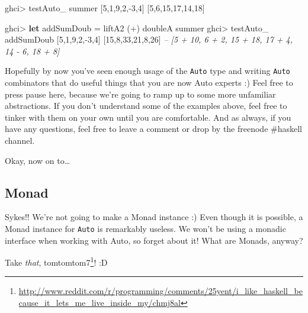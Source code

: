 \documentclass[]{article}
\newenvironment{Shaded}{}{}
\newcommand{\KeywordTok}[1]{\textcolor[rgb]{0.00,0.44,0.13}{\textbf{{#1}}}}
\newcommand{\DecValTok}[1]{\textcolor[rgb]{0.25,0.63,0.44}{{#1}}}
\newcommand{\CommentTok}[1]{\textcolor[rgb]{0.38,0.63,0.69}{\textit{{#1}}}}
\newcommand{\FunctionTok}[1]{\textcolor[rgb]{0.02,0.16,0.49}{{#1}}}
\newcommand{\NormalTok}[1]{{#1}}
\renewcommand{\href}[2]{#2\footnote{\url{#1}}}
\begin{document}
\begin{Shaded}
\begin{Highlighting}[]
\NormalTok{ghci}\FunctionTok{>} \NormalTok{testAuto_ summer [}\DecValTok{5}\NormalTok{,}\DecValTok{1}\NormalTok{,}\DecValTok{9}\NormalTok{,}\DecValTok{2}\NormalTok{,}\FunctionTok{-}\DecValTok{3}\NormalTok{,}\DecValTok{4}\NormalTok{]}
\NormalTok{[}\DecValTok{5}\NormalTok{,}\DecValTok{6}\NormalTok{,}\DecValTok{15}\NormalTok{,}\DecValTok{17}\NormalTok{,}\DecValTok{14}\NormalTok{,}\DecValTok{18}\NormalTok{]}

\NormalTok{ghci}\FunctionTok{>} \KeywordTok{let} \NormalTok{addSumDoub }\FunctionTok{=} \NormalTok{liftA2 (}\FunctionTok{+}\NormalTok{) doubleA summer}
\NormalTok{ghci}\FunctionTok{>} \NormalTok{testAuto_ addSumDoub [}\DecValTok{5}\NormalTok{,}\DecValTok{1}\NormalTok{,}\DecValTok{9}\NormalTok{,}\DecValTok{2}\NormalTok{,}\FunctionTok{-}\DecValTok{3}\NormalTok{,}\DecValTok{4}\NormalTok{]}
\NormalTok{[}\DecValTok{15}\NormalTok{,}\DecValTok{8}\NormalTok{,}\DecValTok{33}\NormalTok{,}\DecValTok{21}\NormalTok{,}\DecValTok{8}\NormalTok{,}\DecValTok{26}\NormalTok{]}
\CommentTok{-- [5 + 10, 6 + 2, 15 + 18, 17 + 4, 14 - 6, 18 + 8]}
\end{Highlighting}
\end{Shaded}

Hopefully by now you've seen enough usage of the \texttt{Auto} type and writing
\texttt{Auto} combinators that do useful things that you are now Auto experts :)
Feel free to press pause here, because we're going to ramp up to some more
unfamiliar abstractions. If you don't understand some of the examples above,
feel free to tinker with them on your own until you are comfortable. And as
always, if you have any questions, feel free to leave a comment or drop by the
freenode \#haskell channel.

Okay, now on to\ldots{}

\subsection{Monad}\label{monad}

Sykes!! We're not going to make a Monad instance :) Even though it is possible,
a Monad instance for \texttt{Auto} is remarkably useless. We won't be using a
monadic interface when working with Auto, so forget about it! What are Monads,
anyway?

Take \emph{that},
\href{http://www.reddit.com/r/programming/comments/25yent/i_like_haskell_because_it_lets_me_live_inside_my/chmj8al}{tomtomtom7}!
:D
\end{document}
